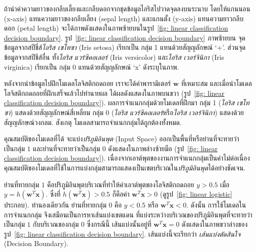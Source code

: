 ถ้านำค่าความยาวของกลีบเลี้ยงและกลีบดอกจากชุดข้อมูลไอริสไปวาดจุดลงบนระนาบ
โดยให้แกนนอน (x-axis) แทนความยาวของกลีบเลี้ยง (sepal length) และแกนตั้ง (y-axis) แทนความยาวกลีบดอก (petal length) จะได้ภาพดังแสดงในภาพซ้ายบนในรูป~\ref{fig: linear classification decision boundary}.
%
รูป~\ref{fig: linear classification decision boundary} 
ภาพซ้ายบน
จุดข้อมูลจากสปีชี่ส์\textit{ไอริส เซโทซา} (Iris setosa) เรียกเป็น กลุ่ม 1 แทนด้วยสัญญลักษณ์ `+'.
ส่วนจุดข้อมูลจากสปีชีส์อื่น ทั้ง\textit{ไอริส แวร์ซิคอเลอร์} (Iris versicolor) และ\textit{ไอริส เวอร์จินิกา} (Iris virginica) เรียกเป็น กลุ่ม 0 แทนด้วยสัญญลักษณ์ `x' ดังระบุในภาพ.

หลังจากนำข้อมูลไปฝึกโมเดลโลจิสติกถดถอย เราจะได้ค่าพารามิเตอร์ $\mathbf{w}$ ที่เหมาะสม
และเมื่อนำโมเดลโลจิสติกถดถอยที่ฝึกเสร็จแล้วไปทำนายผล ได้ผลดังแสดงในภาพบนขวา (รูป~\ref{fig: linear classification decision boundary}).
ผลการจำแนกกลุ่มด้วยโมเดลที่ฝึกมา
กลุ่ม 1 (\textit{ไอริส เซโทซา}) แสดงด้วยสัญญลักษณ์สี่เหลี่ยม
กลุ่ม 0 (\textit{ไอริส แวร์ซิคอเลอร์}หรือ\textit{ไอริส เวอร์จินิกา}) แสดงด้วยสัญญลักษณ์วงกลม.
สังเกตุ โมเดลสามารถจำแนกกลุ่มได้ถูกต้องทั้งหมด.

คุณสมบัติของโมเดลที่ได้ จะแบ่ง\textit{ปริภูมิอินพุต} (Input Space) 
ออกเป็นพื้นที่หรือย่านที่จะทายว่าเป็นกลุ่ม $1$ และย่านที่จะทายว่าเป็นกลุ่ม $0$ ดังแสดงในภาพล่างซ้ายมือ (รูป~\ref{fig: linear classification decision boundary}).
เนื่องจากเอาต์พุตของงานการจำแนกกลุ่มเป็นค่าไม่ต่อเนื่อง 
คุณสมบัติของโมเดลที่ใช้ในการแบ่งกลุ่มสามารถแสดงเป็นเขตบริเวณใน\textit{ปริภูมิอินพุต}ได้อย่างชัดเจน.

ย่านที่ทายกลุ่ม $1$ คือปริภูมิอินพุตบริเวณที่ทำให้ค่าเอาต์พุตของโลจิสติกถดถอย $y > 0.5$ 
เมื่อ $y = h( \mathbf{w}^T \mathbf{x} )$.
ซึ่งที่ $h( \mathbf{w}^T \mathbf{x} ) > 0.5$ ก็คือค่า $\mathbf{w}^T \mathbf{x} > 0$ (ดูรูป~\ref{fig: linear logistic} ประกอบ).
ทำนองเดียวกัน 
ย่านที่ทายกลุ่ม $0$ คือ $y < 0.5$ หรือ $\mathbf{w}^T \mathbf{x} < 0$.
ดังนั้น การใช้โมเดลในการจำแนกกลุ่ม จึงเสมือนเป็นการหาเส้นแบ่งเขตแดน ที่แบ่งระหว่างบริเวณของปริภูมิอินพุตที่จะทายว่าเป็นกลุ่ม $1$ กับบริเวณของกลุ่ม $0$
ซึ่งกรณีนี้ เส้นแบ่งนั้นอยู่ที่ $\mathbf{w}^T \mathbf{x} = 0$ ดังแสดงในภาพขวาล่างของรูป~\ref{fig: linear classification decision boundary}.
เส้นแบ่งนี้จะเรียกว่า \textit{เส้นแบ่งตัดสินใจ} (Decision Boundary).

%
%

